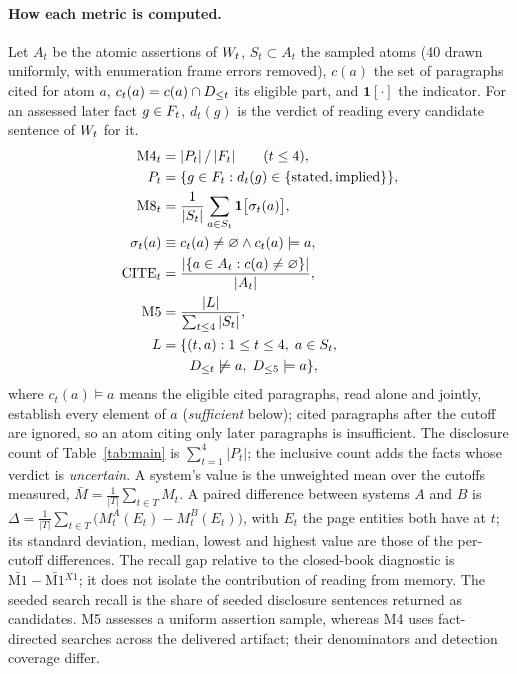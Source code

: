 \paragraph{How each metric is computed.} Let $A_t$ be the atomic assertions of $W_t$, $S_t
\subset A_t$ the sampled atoms (40 drawn uniformly, with enumeration frame errors removed),
$c(a)$ the set of paragraphs cited for atom
$a$, $c_t(a)=c(a)\cap D_{\le t}$ its eligible part, and $\mathbf{1}[\cdot]$ the indicator. For an assessed later fact $g\in F_t$, $d_t(g)$ is
the verdict of reading every candidate sentence of $W_t$ for it.
\begin{align*}
\text{M4}_t &= |P_t|\,/\,|F_t| \qquad (t\le 4),\\
P_t &= \{g\in F_t : d_t(g)\in\{\text{stated},\text{implied}\}\},\\
\text{M8}_t &= \frac{1}{|S_t|}\sum_{a\in S_t}\mathbf{1}\big[\sigma_t(a)\big],\\
\sigma_t(a) &\equiv c_t(a)\neq\varnothing \wedge c_t(a)\models a,\\
\text{CITE}_t &= \frac{|\{a\in A_t : c(a)\neq\varnothing\}|}{|A_t|},\\
\text{M5} &= \frac{|L|}{\sum_{t\le 4}|S_t|},\\
L &= \{(t,a) : 1\le t\le 4,\; a\in S_t,\\
  &\qquad D_{\le t}\not\models a,\; D_{\le 5}\models a\},
\end{align*}
where $c_t(a)\models a$ means the eligible cited paragraphs, read alone and jointly, establish every element
of $a$ (\emph{sufficient} below); cited paragraphs after the cutoff are ignored, so an atom
citing only later paragraphs is insufficient. The disclosure count of Table~\ref{tab:main} is
$\sum_{t=1}^{4}|P_t|$; the inclusive count adds the facts whose verdict is \emph{uncertain}. A system's value is the unweighted mean over the cutoffs measured,
$\bar{M}=\frac{1}{|T|}\sum_{t\in T}M_t$. A paired difference between systems $A$ and $B$ is
$\Delta=\frac{1}{|T|}\sum_{t\in T}\big(M_t^{A}(E_t)-M_t^{B}(E_t)\big)$, with $E_t$ the page
entities both have at $t$; its standard deviation, median, lowest and highest value are those of
the per-cutoff differences. The recall gap relative to the closed-book diagnostic is
$\bar{\text{M1}}-\bar{\text{M1}}{}^{X1}$; it does not isolate the contribution of reading
from memory. The seeded search recall is the share of seeded
disclosure sentences returned as candidates. M5 assesses a uniform assertion sample,
whereas M4 uses fact-directed searches across the delivered artifact; their denominators
and detection coverage differ.

